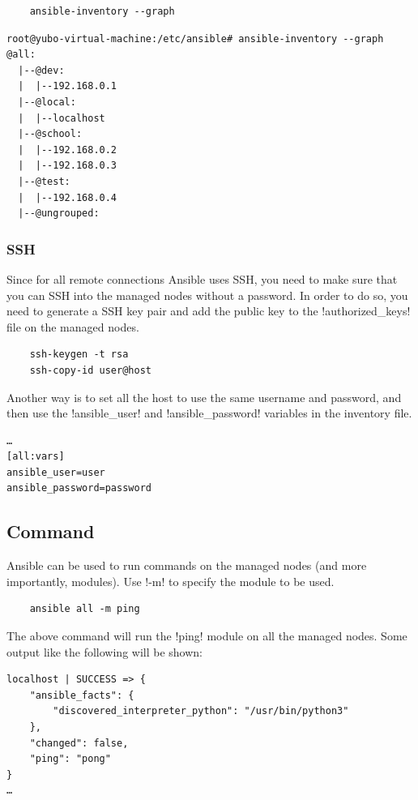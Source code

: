 \documentclass{article}
\begin{document}
\begin{verbatim}
    ansible-inventory --graph
\end{verbatim}

\begin{verbatim}
root@yubo-virtual-machine:/etc/ansible# ansible-inventory --graph
@all:
  |--@dev:
  |  |--192.168.0.1
  |--@local:
  |  |--localhost
  |--@school:
  |  |--192.168.0.2
  |  |--192.168.0.3
  |--@test:
  |  |--192.168.0.4
  |--@ungrouped:
\end{verbatim}

\subsubsection{SSH}

Since for all remote connections Ansible uses SSH, you need to make sure that
you can SSH into the managed nodes without a password. In order to do so, you
need to generate a SSH key pair and add the public key to the
\mono!authorized_keys! file on the managed nodes.

\begin{verbatim}
    ssh-keygen -t rsa
    ssh-copy-id user@host
\end{verbatim}

Another way is to set all the host to use the same username and password, and
then use the \mono!ansible_user! and \mono!ansible_password! variables in the
inventory file.

\begin{verbatim}
…
[all:vars]
ansible_user=user
ansible_password=password
\end{verbatim}

\subsection{Command}

Ansible can be used to run commands on the managed nodes (and more importantly,
modules). Use \mono!-m! to specify the module to be used.

\begin{verbatim}
    ansible all -m ping
\end{verbatim}

The above command will run the \mono!ping! module on all the managed nodes. Some
output like the following will be shown:

\begin{verbatim}
localhost | SUCCESS => {
    "ansible_facts": {
        "discovered_interpreter_python": "/usr/bin/python3"
    },
    "changed": false,
    "ping": "pong"
}
…
\end{verbatim}
\end{document}
